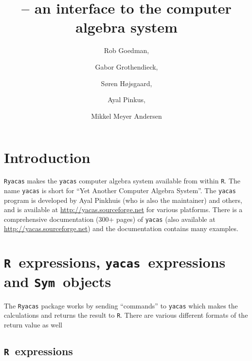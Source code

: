 \documentclass[]{article}
\title{\ryacas{} -- an \rlan{} interface to the \yacas{} computer
  algebra system}
\author{Rob Goedman, \and
Gabor Grothendieck,  \and
Søren Højsgaard,  \and
Ayal Pinkus,  \and
Mikkel Meyer Andersen}
\newcommand{\rlan}{{\tt R}}
\newcommand{\ryacas}{{\tt Ryacas}}
\newcommand{\yacas}{{\tt yacas}}
\def\R{\texttt{R}}
\def\sym{\texttt{Sym}}
\begin{document}
\maketitle
\tableofcontents
\parskip5pt


\renewenvironment{Schunk}{\begin{center}
    \small
    \begin{boxedminipage}{0.95\textwidth}}{
    \end{boxedminipage}\end{center}}



\section{Introduction} 
\label{sec:introduction}

\ryacas{} makes the \yacas{} computer algebra system available from
within \rlan. The name \yacas{} is short for ``Yet Another Computer Algebra
System''. The \yacas{} program 
is developed by Ayal Pinkhuis (who is also the maintainer)
and others, and is available at
\href{http://yacas.sourceforge.net}{http://yacas.sourceforge.net} for various
platforms. There is a comprehensive documentation (300+ pages) of
\yacas{} (also available at
\href{http://yacas.sourceforge.net}{http://yacas.sourceforge.net}) and the
documentation contains many examples.




\section{\R\ expressions,  \yacas\ expressions and \sym\ objects} 
\label{sec:hood}

The \ryacas{} package works by sending ``commands''
to \yacas{} which makes the calculations and returns the result
to \R{}. There are various different formats of the return value as well

\subsection{\R\ expressions}
\end{document}
